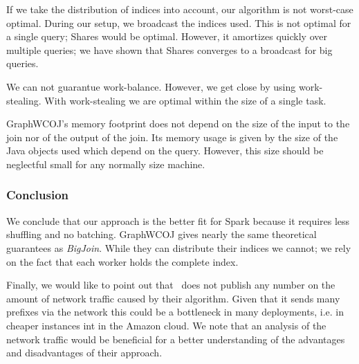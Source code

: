 If we take the distribution of indices into account, our algorithm is not worst-case optimal.
During our setup, we broadcast the indices used.
This is not optimal for a single query;
Shares would be optimal.
However, it amortizes quickly over multiple queries;
we have shown that Shares converges to a broadcast for big queries.

We can not guarantue work-balance.
However, we get close by using work-stealing.
With work-stealing we are optimal within the size of a single task.

GraphWCOJ's memory footprint does not depend on the size of the input to the join nor of the output of the join.
Its memory usage is given by the size of the Java objects used which depend on the query.
However, this size should be neglectful small for any normally size machine.

\subsubsection{Conclusion}
We conclude that our approach is the better fit for Spark because it requires less shuffling and no batching.
GraphWCOJ gives nearly the same theoretical guarantees as \textit{BigJoin}.
While they can distribute their indices we cannot;
we rely on the fact that each worker holds the complete index.

Finally, we would like to point out that~\cite{ammar2018distributed} does not publish any number on the amount
of network traffic caused by their algorithm.
Given that it sends many prefixes via the network this could be a bottleneck in many deployments, i.e. in cheaper instances
int in the Amazon cloud.
We note that an analysis of the network traffic would be beneficial for a better understanding of the advantages and disadvantages
of their approach.






